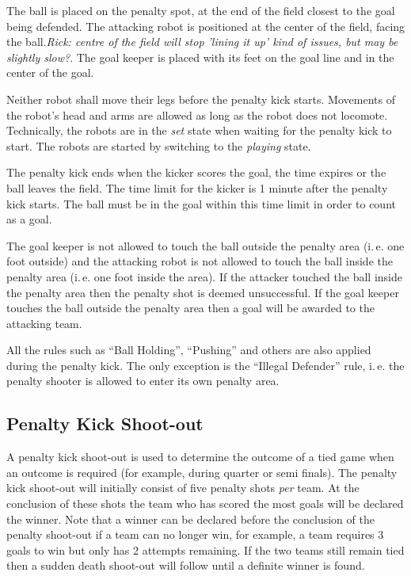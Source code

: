 \documentclass[12pt]{article}
\newcommand{\ie}{\mbox{i.\,e.}\xspace}
\begin{document}
The ball is placed on the penalty spot, at the end of the field closest to the goal being defended. The attacking robot is positioned at the center of the field, facing the ball.\emph{Rick: centre of the field will stop 'lining it up' kind of issues, but may be slightly slow?}. The goal keeper is placed with its feet on the
goal line and in the center of the goal.

Neither robot shall move their legs before the penalty kick starts. Movements of the
robot's head and arms are allowed as long as the robot does not
locomote. Technically, the robots are in the \emph{set} state when
waiting for the penalty kick to start. The robots are started by
switching to the \emph{playing} state.

The penalty
kick ends when the kicker scores the goal, the time expires or the
ball leaves the field. The time limit for the kicker is 1 minute
after the penalty kick starts. The ball must be in the goal within
this time limit in order to count as a goal.

The goal keeper is not allowed to touch the ball outside the penalty area (\ie one foot
outside) and the attacking robot is not allowed to touch the ball inside the penalty
area (\ie one foot inside the area). If the attacker touched the ball inside the
penalty area then the penalty shot is deemed unsuccessful. If the
goal keeper touches the ball outside the penalty area then a goal will be awarded to the
attacking team.

All the rules such as ``Ball Holding'', ``Pushing'' and
others are also applied during the penalty kick. The only exception
is the ``Illegal Defender'' rule, \ie the penalty shooter is allowed
to enter its own penalty area.

\subsection{Penalty Kick Shoot-out}
\label{sec:penalty_shoot-out}

A penalty kick shoot-out is used to determine the outcome of a tied
game when an outcome is required (for example, during quarter or semi finals).
The penalty kick shoot-out will initially consist of five
penalty shots \emph{per} team. At the conclusion of these shots the
team who has scored the most goals will be declared the winner. Note
that a winner can be declared before the conclusion of the penalty
shoot-out if a team can no longer win, for example, a team requires 3 goals
to win but only has 2 attempts remaining. If the two teams still
remain tied then a sudden death shoot-out will follow until a
definite winner is found.
\end{document}
